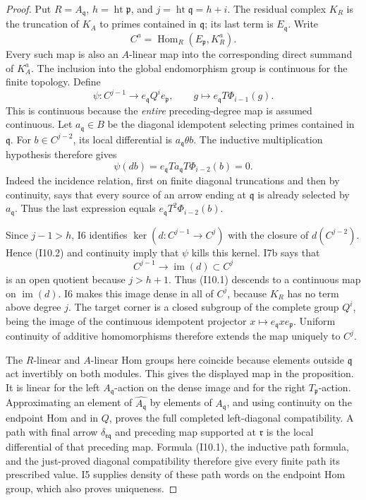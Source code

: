 \begin{proof}
Put $R=A_{\mathfrak q}$, $h=\operatorname{ht}\mathfrak p$, and
$j=\operatorname{ht}\mathfrak q=h+i$. The residual complex $K_R$
is the truncation of $K_A$ to primes contained in $\mathfrak q$;
its last term is $E_{\mathfrak q}$. Write
\[
 C^a=\operatorname{Hom}_R(E_{\mathfrak p},K_R^a).
\]
Every such map is also an $A$-linear map into the corresponding
direct summand of $K_A^a$. The inclusion into the global
endomorphism group is continuous for the finite topology. Define
\[
 \psi:C^{j-1}\longrightarrow e_{\mathfrak q}Q^i e_{\mathfrak p},
 \qquad g\longmapsto e_{\mathfrak q}T\Phi_{i-1}(g).
                                                        \tag{I10.1}
\]
This is continuous because the \emph{entire} preceding-degree map
is assumed continuous. Let $a_{\mathfrak q}\in B$ be the diagonal
idempotent selecting primes contained in $\mathfrak q$.
For $b\in C^{j-2}$, its local differential is
$a_{\mathfrak q}\theta b$. The inductive multiplication hypothesis
therefore gives
\[
 \psi(db)
  =e_{\mathfrak q}T a_{\mathfrak q}T\Phi_{i-2}(b)=0.     \tag{I10.2}
\]
Indeed the incidence relation, first on finite diagonal truncations
and then by continuity, says that every source of an arrow ending
at $\mathfrak q$ is already selected by $a_{\mathfrak q}$.
Thus the last expression equals
$e_{\mathfrak q}T^2\Phi_{i-2}(b)$.

Since $j-1>h$, I6 identifies $\ker(d:C^{j-1}\to C^j)$ with
the closure of $d(C^{j-2})$. Hence (I10.2) and continuity imply
that $\psi$ kills this kernel. I7b says that
\[
 C^{j-1}\longrightarrow\operatorname{im}(d)\subset C^j
\]
is an open quotient because $j>h+1$. Thus (I10.1) descends to a
continuous map on $\operatorname{im}(d)$. I6 makes this image dense
in all of $C^j$, because $K_R$ has no term above degree $j$.
The target corner is a closed subgroup of the complete group $Q^i$,
being the image of the continuous idempotent projector
$x\mapsto e_{\mathfrak q}xe_{\mathfrak p}$.
Uniform continuity of additive homomorphisms therefore extends the
map uniquely to $C^j$.

The $R$-linear and $A$-linear Hom groups here coincide because
elements outside $\mathfrak q$ act invertibly on both modules.
This gives the displayed map in the proposition. It is linear for
the left $A_{\mathfrak q}$-action on the dense image and for the
right $T_{\mathfrak p}$-action. Approximating an element of
$\widehat{A_{\mathfrak q}}$ by elements of $A_{\mathfrak q}$,
and using continuity on the endpoint Hom and in $Q$, proves the
full completed left-diagonal compatibility. A path with final arrow
$\delta_{\mathfrak r\mathfrak q}$ and preceding map supported
at $\mathfrak r$ is the local differential of that preceding map.
Formula (I10.1), the inductive path formula, and the just-proved
diagonal compatibility therefore give every finite path its
prescribed value.
I5 supplies density of these path words on the endpoint Hom group,
which also proves uniqueness.
\end{proof}

